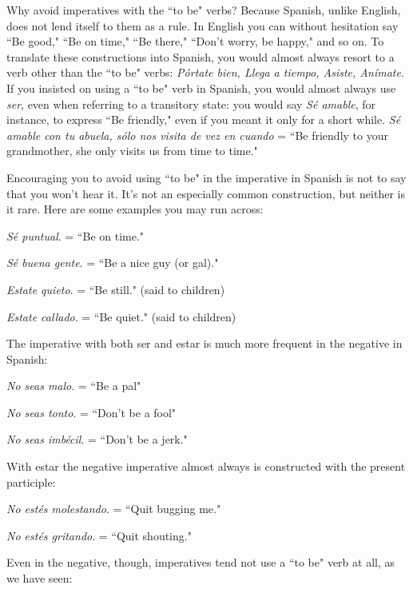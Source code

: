 Why avoid imperatives with the ``to be" verbs? Because Spanish, unlike English, does not lend itself to them as a rule. In English
you can without hesitation say ``Be good," ``Be on time," ``Be there,"
``Don't worry, be happy," and so on. To translate these constructions
into Spanish, you would almost always resort to a verb other than the
``to be" verbs: \emph{Pórtate bien, Llega a tiempo, Asiste, Anímate}. If you
insisted on using a ``to be" verb in Spanish, you would almost always
use \emph{ser}, even when referring to a transitory state: you would say \emph{Sé
	amable}, for instance, to express ``Be friendly," even if you meant it
only for a short while. \emph{Sé amable con tu abuela, sólo nos visita de vez
	en cuando} = ``Be friendly to your grandmother, she only visits us from
time to time."

Encouraging you to avoid using ``to be" in the imperative in
Spanish is not to say that you won't hear it. It's not an especially common construction, but neither is it rare. Here are some examples you
may run across:

\bsk

\indu \emph{Sé puntual}. = ``Be on time."

\indu \emph{Sé buena gente}. = ``Be a nice guy (or gal)."

\indu \emph{Estate quieto}. = ``Be still." (said to children)

\indu \emph{Estate callado}. = ``Be quiet." (said to children)

\bsk

The imperative with both ser and estar is much more frequent
in the negative in Spanish:

\bsk

\indu \emph{No seas malo}. = ``Be a pal"

\indu \emph{No seas tonto}. = ``Don't be a fool"

\indu \emph{No seas imbécil}. = ``Don't be a jerk."

\bsk

With estar the negative imperative almost always is constructed with the present participle:

\bsk

\indu \emph{No estés molestando}. = ``Quit bugging me."

\indu \emph{No estés gritando}. = ``Quit shouting."

\bsk

Even in the negative, though, imperatives tend not use a ``to
be" verb at all, as we have seen:

